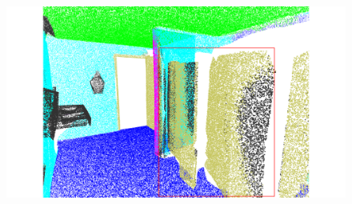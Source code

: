\begin{figure}[htbp]
\begin{minipage}{0.22\textwidth}
    \end{minipage}
    \hfill
    \begin{minipage}{0.22\textwidth}
        \centering
        \includegraphics[width=\textwidth]{fig/supplement/semantic_segmentation/wc_2/PointGST_wc_2.pdf}
    \end{minipage}
    \hfill

    \vspace{0.5em}


\end{figure}
